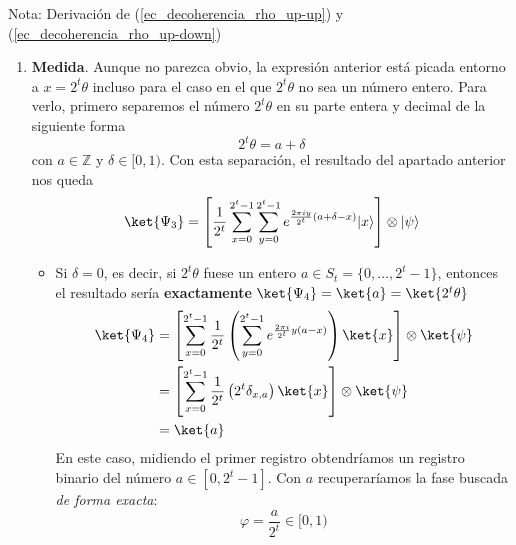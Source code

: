 \documentclass[a4paper,11pt]{book} %
\numberwithin{equation}{chapter}
\def\lp{\left(}
\def\rp{\right)}
\def\lc{\left[}
\def\rc{\right]}
\begin{document}
\begin{mybox_blue}{Nota: Derivación de (\ref{ec_decoherencia_rho_up-up}) y  (\ref{ec_decoherencia_rho_up-down})}
\begin{enumerate}
Lo que podemos hacer es aplicar la transformada de Fourier inversa en el registro de conteo para obtener el valor $2^t \theta$
	\begin{align*}
	\ket{\Psi_3} = \lc U_{QFT}^\dagger \lp \frac{1}{2^{t/2}}\sum_{y=0}^{2^{t}-1}e^{{2\pi i} \theta y}|y\rangle \rp \rc \otimes \vert\psi\rangle & =  \lc \frac{1}{2^{t/2}}\sum_{y=0}^{2^{t}-1}e^{{2\pi i} \theta y} \left( U^\dagger_{QFT}|y\rangle \right) \rc \otimes \vert\psi\rangle \\ \rule{0mm}{10mm}
	& = \lc \frac{1}{2^{t/2}}\sum_{y=0}^{2^{t}-1}e^{{2\pi i} \theta y} \left( \sum^{2^t-1}_{x=0} e^{-2 \pi i y x /2^t} \ket{x} \right) \rc \otimes \vert\psi\rangle \\ \rule{0mm}{10mm}
	& = \lc \frac{1}{2^{t}} \sum_{x=0}^{2^t-1} \sum_{y=0}^{2^{t}-1}e^{-\frac{2 \pi i y}{2^t} (x-2^t \theta)} |x\rangle \rc \otimes \vert\psi\rangle
	\end{align*}

En general, $2^t \theta$ no será un número entero, así que, en general $(x-2^t \theta) \neq  0$ $\forall x \in \mathbb{Z}$.

	\item \textbf{Medida}. Aunque no parezca obvio, la expresión anterior está picada entorno a $x = 2^t \theta$ incluso para el caso en el que $2^t \theta$ no sea un número entero. Para verlo, primero separemos el número $2^t \theta$ en su parte entera y decimal de la siguiente forma
	\begin{equation*}
	2^t \theta = a + \delta
 	\end{equation*} 
con $a \in \mathbb{Z}$ y $\delta \in [0,1)$. Con esta separación, el resultado del apartado anterior nos queda
	\begin{equation} \label{ec_QPE_Psi3_2}
	\ket{\Psi_3} = \lc \frac{1}{2^{t}} \sum_{x=0}^{2^t-1} \sum_{y=0}^{2^{t}-1}e^{\frac{2 \pi i y}{2^t} (a+\delta -x )} |x\rangle \rc \otimes \vert\psi\rangle
	\end{equation}

	\begin{itemize}
		\item Si $\delta = 0$, es decir, si $2^t \theta$ fuese un entero $a \in S_t = \{ 0, \dots, 2^t-1 \}$, entonces el resultado sería \textbf{exactamente} $\ket{\Psi_4} = \ket{a} = \ket{2^t \theta}$
			\begin{align*}
			\ket{\Psi_4} & = \lc \sum_{x=0}^{2^t-1} \frac{1}{2^t} \lp \sum^{2^t-1}_{y = 0} e^{\frac{2 \pi i}{2^t} y (a-x)} \rp \ket{x} \rc \otimes \ket{\psi} \\
			& = \lc \sum_{x=0}^{2^t-1} \frac{1}{2^t} \lp 2^t \delta_{x,a} \rp \ket{x} \rc \otimes \ket{\psi} \\
			& = \ket{a}
			\end{align*}
		En este caso, midiendo el primer registro obtendríamos un registro binario del número $a\in[0, 2^t-1]$. Con $a$ recuperaríamos la fase buscada \textit{de forma exacta}:
		$$
		\varphi = \frac{a}{2^t}  \in [0,1)
		$$ 
		

\end{itemize}
\end{enumerate}
\end{mybox_blue}
\end{document}
